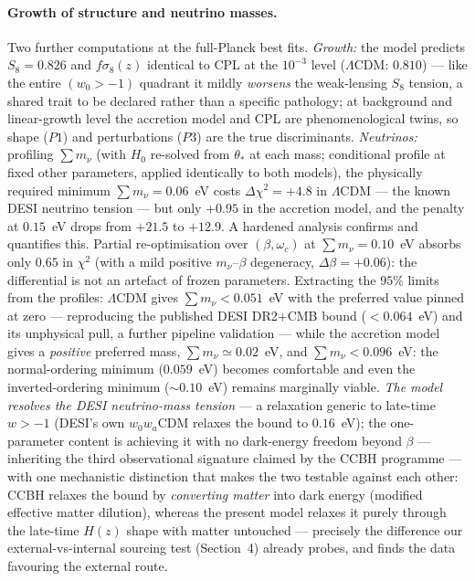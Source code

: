 \documentclass[11pt]{article}
\begin{document}
\paragraph{Growth of structure and neutrino masses.} Two further computations at the full-Planck best fits. \emph{Growth:} the model predicts $S_8 = 0.826$ and $f\sigma_8(z)$ identical to CPL at the $10^{-3}$ level ($\Lambda$CDM: $0.810$) --- like the entire $(w_0>-1)$ quadrant it mildly \emph{worsens} the weak-lensing $S_8$ tension, a shared trait to be declared rather than a specific pathology; at background and linear-growth level the accretion model and CPL are phenomenological twins, so shape ($P1$) and perturbations ($P3$) are the true discriminants. \emph{Neutrinos:} profiling $\sum m_\nu$ (with $H_0$ re-solved from $\theta_*$ at each mass; conditional profile at fixed other parameters, applied identically to both models), the physically required minimum $\sum m_\nu = 0.06$~eV costs $\Delta\chi^2 = +4.8$ in $\Lambda$CDM --- the known DESI neutrino tension --- but only $+0.95$ in the accretion model, and the penalty at $0.15$~eV drops from $+21.5$ to $+12.9$. A hardened analysis confirms and quantifies this. Partial re-optimisation over $(\beta, \omega_c)$ at $\sum m_\nu = 0.10$~eV absorbs only $0.65$ in $\chi^2$ (with a mild positive $m_\nu$--$\beta$ degeneracy, $\Delta\beta = +0.06$): the differential is not an artefact of frozen parameters. Extracting the $95\%$ limits from the profiles: $\Lambda$CDM gives $\sum m_\nu < 0.051$~eV with the preferred value pinned at zero --- reproducing the published DESI DR2+CMB bound ($<0.064$~eV) and its unphysical pull, a further pipeline validation --- while the accretion model gives a \emph{positive} preferred mass, $\sum m_\nu \simeq 0.02$~eV, and $\sum m_\nu < 0.096$~eV: the normal-ordering minimum ($0.059$~eV) becomes comfortable and even the inverted-ordering minimum ($\sim0.10$~eV) remains marginally viable. \emph{The model resolves the DESI neutrino-mass tension} --- a relaxation generic to late-time $w > -1$ (DESI's own $w_0w_a$CDM relaxes the bound to $0.16$~eV); the one-parameter content is achieving it with no dark-energy freedom beyond $\beta$ --- inheriting the third observational signature claimed by the CCBH programme \cite{Croker2024} --- with one mechanistic distinction that makes the two testable against each other: CCBH relaxes the bound by \emph{converting matter} into dark energy (modified effective matter dilution), whereas the present model relaxes it purely through the late-time $H(z)$ shape with matter untouched --- precisely the difference our external-vs-internal sourcing test (Section~4) already probes, and finds the data favouring the external route.
\end{document}
